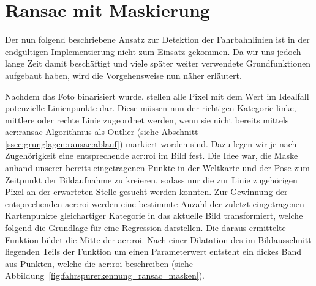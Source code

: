 \section{Ransac mit Maskierung \dcfirstauthorshort} 
\label{sec:maskenbau}

Der nun folgend beschriebene Ansatz zur Detektion der Fahrbahnlinien ist in der endgültigen Implementierung nicht zum Einsatz gekommen. Da wir uns jedoch lange Zeit damit beschäftigt und viele später weiter verwendete Grundfunktionen aufgebaut haben, wird die Vorgehensweise nun näher erläutert.


Nachdem das Foto binarisiert wurde, stellen alle Pixel mit dem Wert \grqq{} im Idealfall potenzielle Linienpunkte dar. Diese müssen nun der richtigen Kategorie \glqq linke\grqq , \glqq mittlere\grqq{} oder \glqq rechte\grqq{} Linie zugeordnet werden, wenn sie nicht bereits mittels \gls{acr:ransac}-Algorithmus als Outlier (siehe Abschnitt \ref{ssec:grunglagen:ransac:ablauf}) markiert worden sind. Dazu legen wir je nach Zugehörigkeit eine entsprechende \gls{acr:roi} im Bild fest. Die Idee war, die Maske anhand unserer bereits eingetragenen Punkte in der Weltkarte und der Pose zum Zeitpunkt der Bildaufnahme zu kreieren, sodass nur die zur Linie zugehörigen Pixel an der erwarteten Stelle gesucht werden konnten. 
Zur Gewinnung der entsprechenden \gls{acr:roi} werden eine bestimmte Anzahl der zuletzt eingetragenen Kartenpunkte gleichartiger Kategorie in das aktuelle Bild transformiert, welche folgend die Grundlage für eine Regression darstellen. Die daraus ermittelte Funktion bildet die Mitte der \gls{acr:roi}. Nach einer Dilatation des im Bildausschnitt liegenden Teils der Funktion um einen Parameterwert entsteht ein dickes Band aus Punkten, welche die \gls{acr:roi} beschreiben (siehe Abbildung~\ref{fig:fahrspurerkennung_ransac_masken}).

